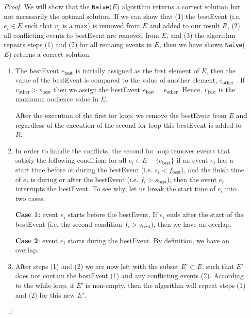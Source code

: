 \documentclass[11pt, oneside]{article}   	%
\theoremstyle{definition}
\theoremstyle{remark}
\begin{document}
\begin{proof}
	We will show that the \texttt{Naive}($E$) algorithm returns a correct solution but not necessarily the optimal solution. If we can show that (1) the bestEvent (i.e. $e_i\in E$ such that $v_i$ is a max) is removed from $E$ and added to our result $R$, (2) all conflicting events to bestEvent are removed from $E$, and (3) the algorithm repeats steps (1) and (2) for all remaing events in $E$, then we have shown \texttt{Naive}($E$) returns a correct solution. 
	\begin{enumerate}
		\item The bestEvent $e_\text{best}$ is initially assigned as the first element of $E$, then the value of the bestEvent is compared to the value of another element, $e_\text{other}$ . If $v_\text{other} > v_\text{best}$ then we assign the bestEvent $e_\text{best} = e_\text{other}$. Hence, $v_\text{best}$ is the maximum audience value in $E$.
		
		After the execution of the first for loop, we remove the bestEvent from $E$ and regardless of the execution of the second for loop this bestEvent is added to $R$.
		
		\item In order to handle the conflicts, the second for loop removes events that satisfy the following condition: for all $ e_i \in E - \{e_\text{best}\}$ if an event $e_i$ has a start time before or during the bestEvent (i.e. $s_i < f_\text{best}$), and the finish time of $e_i$ is during or after the bestEvent (i.e. $f_i > s_\text{best}$), then the event $e_i$ interrupts the bestEvent. To see why, let us break the start time of $e_i$ into two cases.
		
			\textbf{Case 1:} event $e_i$ starts before the bestEvent. If $e_i$ ends after the start of the bestEvent (i.e. the second condition $f_i > s_\text{best}$), then we have an overlap.
		
			\textbf{Case 2}: event $e_i$ starts during the bestEvent. By definition, we have an overlap.
		
		\item After steps (1) and (2) we are now left with the subset $E' \subset E$, such that $E'$ does not contain the bestEvent (1) and any conflicting events (2). According to the while loop, if $E'$ is non-empty, then the algorithm will repeat steps (1) and (2) for this new $E'$.
	\end{enumerate}
\end{proof}
\end{document}
